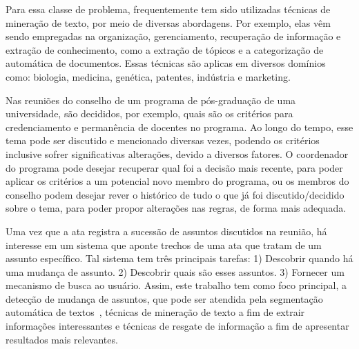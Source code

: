 Para essa classe de problema, frequentemente tem sido utilizadas técnicas de mineração de texto, por meio de diversas abordagens. Por exemplo, elas  vêm sendo empregadas na organização, gerenciamento, recuperação de informação e extração de conhecimento, como a extração de tópicos e a categorização de automática de documentos. Essas técnicas são aplicas em diversos domínios como: biologia, medicina, genética, patentes, indústria e marketing. %


Nas reuniões do conselho de um programa de pós-graduação de uma universidade, são decididos, por exemplo, quais são os critérios para credenciamento e permanência de docentes no programa. Ao longo do tempo, esse tema pode ser discutido e mencionado diversas vezes, podendo os critérios inclusive sofrer significativas alterações, devido a diversos fatores. O coordenador do programa pode desejar recuperar qual foi a decisão mais recente, para poder aplicar os critérios a um potencial novo membro do programa, ou os membros do conselho podem desejar rever o histórico de tudo o que já foi discutido/decidido sobre o tema, para poder propor alterações nas regras, de forma mais adequada.




Uma vez que a ata registra a sucessão de assuntos discutidos na reunião, há interesse em um sistema que aponte trechos de uma ata que tratam de um assunto específico. Tal sistema tem três principais tarefas: 1) Descobrir quando há uma mudança de assunto. 2) Descobrir quais são esses assuntos. 3) Fornecer um mecanismo de busca ao usuário. Assim, este trabalho tem como foco principal, a detecção de mudança de assuntos, que pode ser atendida pela segmentação automática de textos~\cite{Chen2017,Naili2016,Cardoso2017}, técnicas de mineração de texto a fim de extrair informações interessantes e técnicas de resgate de informação a fim de apresentar resultados mais relevantes. 




